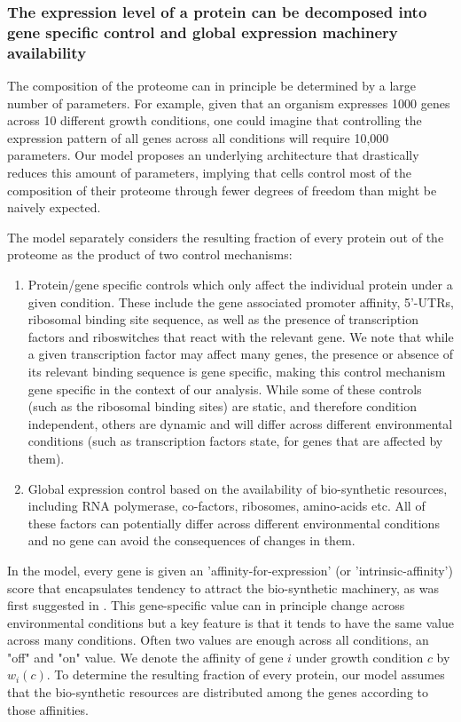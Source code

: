 \subsubsection{The expression level of a protein can be decomposed into gene specific control and global
expression machinery availability}
The composition of the proteome can in principle be determined by a large number of parameters.
For example, given that an organism expresses 1000 genes across 10 different growth conditions, one could imagine that controlling the expression pattern of all genes across all conditions will require 10,000 parameters.
Our model proposes an underlying architecture that drastically reduces this amount of parameters, implying that cells control most of the composition of their proteome through fewer degrees of freedom than might be naively expected.

The model separately considers the resulting fraction of every protein out of the proteome as the product of two control mechanisms:
\begin{enumerate}
\item Protein/gene specific controls which only affect the individual protein under a given condition.
These include the gene associated promoter affinity, 5'-UTRs, ribosomal binding site sequence, as well as the presence of transcription factors and riboswitches that react with the relevant gene.
We note that while a given transcription factor may affect many genes, the presence or absence of its relevant binding sequence is gene specific, making this control mechanism gene specific in the context of our analysis.
  While some of these controls (such as the ribosomal binding sites) are static, and therefore condition independent, others are dynamic and will differ across different environmental conditions (such as transcription factors state, for genes that are affected by them).
\item Global expression control based on the availability of bio-synthetic resources, including RNA polymerase, co-factors, ribosomes, amino-acids etc.
  All of these factors can potentially differ across different environmental conditions and no gene can avoid the consequences of changes in them.
\end{enumerate}

In the model, every gene is given an 'affinity-for-expression' (or 'intrinsic-affinity') score that encapsulates tendency to attract the bio-synthetic machinery, as was first suggested in \cite{Maaloe1969}.
This gene-specific value can in principle change across environmental conditions but a key feature is that it tends to have the same value across many conditions.
Often two values are enough across all conditions, an "off" and "on" value.
We denote the affinity of gene $i$ under growth condition $c$ by $w_i(c)$.
To determine the resulting fraction of every protein, our model assumes that the bio-synthetic resources are distributed among the genes according to those affinities.

